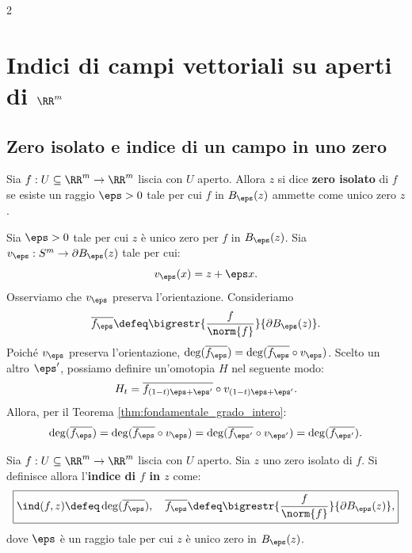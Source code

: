 \begin{multicols*}{2}
    \section{Indici di campi vettoriali su aperti di \texorpdfstring{$\RR^m$}{ℝᵐ}}

    \subsection{Zero isolato e indice di un campo in uno zero}

    \begin{definition}
        Sia $f : U \subseteq \RR^m \to \RR^m$ liscia con $U$ aperto. Allora
        $z$ si dice \textbf{zero isolato} di $f$ se esiste un raggio $\eps > 0$
        tale per cui $f$ in $B_\eps(z)$ ammette come unico zero $z$.
    \end{definition}

    \begin{remark}
        Sia $\eps > 0$ tale per cui $z$ è unico zero per $f$ in $B_\eps(z)$.
        Sia $v_\eps : S^m \to \partial B_\eps(z)$ tale per cui:
        \[
            v_\eps(x) = z + \eps x.
        \]
        Osserviamo che $v_\eps$ preserva l'orientazione. Consideriamo
        \[
            \overline{f_\eps} \defeq \bigrestr{\frac{f}{\norm{f}}}{\partial B_\eps(z)}.
        \]
        Poiché $v_\eps$ preserva l'orientazione, $\deg(\overline{f_\eps}) = \deg(\overline{f_\eps} \circ v_\eps)$.
        Scelto un altro $\eps'$, possiamo definire un'omotopia $H$ nel seguente modo:
        \[
            H_t = \overline{f_{(1-t)\eps + \eps'}} \circ v_{(1-t)\eps + \eps'}.
        \]
        Allora, per il Teorema \ref{thm:fondamentale_grado_intero}:
        \[
            \deg(\overline{f_\eps}) = \deg(\overline{f_\eps} \circ v_\eps) = \deg(\overline{f_{\eps'}} \circ v_{\eps'}) = \deg(\overline{f_{\eps'}}).
        \]
    \end{remark}

    \begin{definition}[Indice di $f$ in $z$]
        Sia $f : U \subseteq \RR^m \to \RR^m$ liscia con $U$ aperto. Sia
        $z$ uno zero isolato di $f$. Si definisce allora l'\textbf{indice di $f$ in $z$}
        come:
        \[
            \boxed{\ind(f, z) \defeq \deg(\overline{f_\eps}), \quad \overline{f_\eps} \defeq \bigrestr{\frac{f}{\norm{f}}}{\partial B_\eps(z)},}
        \]
        dove $\eps$ è un raggio tale per cui $z$ è unico zero in $B_\eps(z)$.
    \end{definition}


\end{multicols*}
